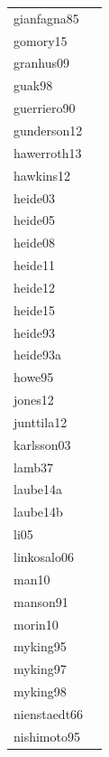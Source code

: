 \documentclass[11pt]{article}
\begin{document}
\begin{footnotesize}
\begin{longtable}{p{}p{}}
  gianfagna85 & \citep{Gianfagna:1985aa} \\ 
  gomory15 & \citep{Gomory:2015aa} \\ 
  granhus09 & \citep{Granhus:2009aa} \\ 
  guak98 & \citep{Guak:1998aa} \\ 
  guerriero90 & \citep{guerriero:1990} \\ 
  gunderson12 & \citep{Gunderson:2012aa} \\ 
  hawerroth13 & \citep{Hawerroth:2013aa} \\ 
  hawkins12 & \citep{Hawkins:2012} \\ 
  heide03 & \citep{Heide:2003aa} \\ 
  heide05 & \citep{Heide:2005aa} \\ 
  heide08 & \citep{Heide:2008aa} \\ 
  heide11 & \citep{Heide:2011aa} \\ 
  heide12 & \citep{Heide:2012aa} \\ 
  heide15 & \citep{Heide:2015aa} \\ 
  heide93 & \citep{Heide:1993} \\ 
  heide93a & \citep{Heide:1993a} \\ 
  howe95 & \citep{Howe:1995aa} \\ 
  jones12 & \citep{Jones:2012} \\ 
  junttila12 & \citep{Junttila:2012aa} \\ 
  karlsson03 & \citep{Karlsson:2003aa} \\ 
  lamb37 & \citep{Lamb:1948aa} \\ 
  laube14a & \citep{Laube:2014a} \\ 
  laube14b & \citep{Laube:2014b} \\ 
  li05 & \citep{Li:2005aa} \\ 
  linkosalo06 & \citep{Linkosalo:2006aa} \\ 
  man10 & \citep{Man:2010aa} \\ 
  manson91 & \citep{Manson:1991aa} \\ 
  morin10 & \citep{Morin:2010aa} \\ 
  myking95 & \citep{Myking:1995} \\ 
  myking97 & \citep{Myking:1997aa} \\ 
  myking98 & \citep{Myking:1998aa} \\ 
  nienstaedt66 & \citep{Nienstaedt:1966aa} \\ 
  nishimoto95 & \citep{Nishimoto:1994aa} \\ 

\end{longtable}
\end{footnotesize}
\end{document}
